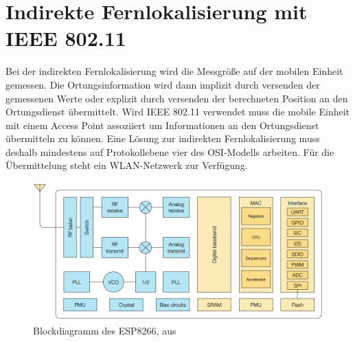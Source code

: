 \chapter{Indirekte Fernlokalisierung mit IEEE 802.11}
\label{ch:phase1}
Bei der indirekten Fernlokalisierung wird die Messgröße auf der mobilen Einheit gemessen.
Die Ortungsinformation wird dann implizit durch versenden der gemessenen Werte oder explizit durch versenden der berechneten Position an den Ortungsdienst übermittelt.
Wird IEEE 802.11 verwendet muss die mobile Einheit mit einem Access Point assoziiert um Informationen an den Ortungsdienst übermitteln zu können.
Eine Lösung zur indirekten Fernlokalisierung muss deshalb mindestens auf Protokollebene vier des OSI-Modells arbeiten.
Für die Übermittelung steht ein WLAN-Netzwerk zur Verfügung.

\begin{figure}[h]
  \centering
	\includegraphics[width=\textwidth]{images/espblock.png}
  \caption{Blockdiagramm des ESP8266, aus \cite{espressif2017esp8266}}
  \label{fig:espblock}
\end{figure}

